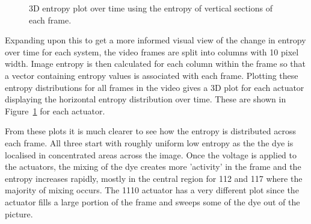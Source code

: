 \begin{figure}[H]
    \center
     \caption{3D entropy plot over time using the entropy of vertical sections of each frame.}
     \label{fig:entplots}
\end{figure}


Expanding upon this to get a more informed visual view of the change in entropy over time for each system,  the video frames are split into columns with 10 pixel width. Image entropy is then calculated for each column within the frame so that a vector containing entropy values is associated with each frame. Plotting these entropy distributions for all frames in the video gives a 3D plot for each actuator displaying the horizontal entropy distribution over time. These are shown in Figure~\ref{fig:entplots} for each actuator.


From these plots it is much clearer to see how the entropy is distributed across each frame. All three start with roughly uniform low entropy as the the dye is localised in concentrated areas across the image. Once the voltage is applied to the actuators, the mixing of the dye creates more 'activity' in the frame and the entropy increases rapidly, mostly in the central region for 112 and 117 where the majority of mixing occurs. The 1110 actuator has a very different plot since the actuator fills a large portion of the frame and sweeps some of the dye out of the picture. 


